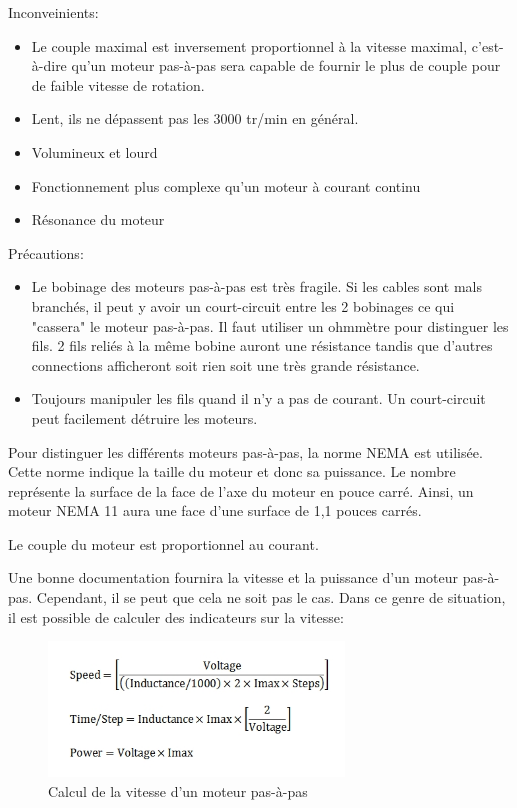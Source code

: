 \documentclass[a4paper, 11pt]{report}
\begin{document}
Inconveinients:
\begin{itemize}
\item Le couple maximal est inversement proportionnel à la vitesse maximal, c'est-à-dire qu'un moteur pas-à-pas sera capable de fournir le plus de couple pour de faible vitesse de rotation.
\item Lent, ils ne dépassent pas les 3000 tr/min en général.
\item Volumineux et lourd
\item Fonctionnement plus complexe qu'un moteur à courant continu
\item Résonance du moteur
\end{itemize}

Précautions:
\begin{itemize}
\item Le bobinage des moteurs pas-à-pas est très fragile. Si les cables sont mals branchés, il peut y avoir un court-circuit entre les 2 bobinages ce qui "cassera" le moteur pas-à-pas. Il faut utiliser un ohmmètre pour distinguer les fils. 2 fils reliés à la même bobine auront une résistance tandis que d'autres connections afficheront soit rien soit une très grande résistance.
\item Toujours manipuler les fils quand il n'y a pas de courant. Un court-circuit peut facilement détruire les moteurs.
\end{itemize}

Pour distinguer les différents moteurs pas-à-pas, la norme NEMA est utilisée. Cette norme indique la taille du moteur et donc sa puissance. Le nombre représente la surface de la face de l'axe du moteur en pouce carré. Ainsi, un moteur NEMA 11 aura une face d'une surface de 1,1 pouces carrés.

Le couple du moteur est proportionnel au courant.

Une bonne documentation fournira la vitesse et la puissance d'un moteur pas-à-pas. Cependant, il se peut que cela ne soit pas le cas. Dans ce genre de situation, il est possible de calculer des indicateurs sur la vitesse:

\begin{figure}[h]
\caption{Calcul de la vitesse d'un moteur pas-à-pas}

\begin{centering}
\includegraphics[width=0.7\textwidth]{images/SpeedCalculator.jpeg}
\par\end{centering}
\end{figure}
\end{document}
